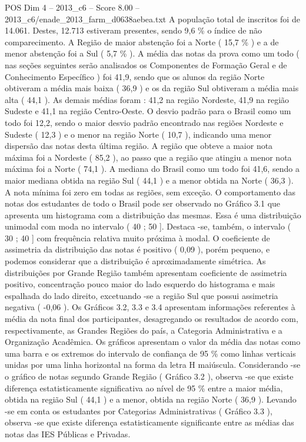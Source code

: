 \begin{textsample}{POS Dim 4 – 2013\_c6 – Score 8.00 – 2013\_c6/enade\_2013\_farm\_d0638aebea.txt}
A população total de inscritos foi de 14.061.
Destes, 12.713 estiveram presentes, sendo 9,6 \% o índice de não comparecimento.
A Região de maior abstenção foi a Norte ( 15,7 \% ) e a de menor abstenção foi a Sul ( 5,7 \% ).
A média das notas da prova como um todo ( nas seções seguintes serão analisados os Componentes de Formação Geral e de Conhecimento Específico ) foi 41,9, sendo que os alunos da região Norte obtiveram a média mais baixa ( 36,9 ) e os da região Sul obtiveram a média mais alta ( 44,1 ).
As demais médias foram : 41,2 na região Nordeste, 41,9 na região Sudeste e 41,1 na região Centro-Oeste.
O desvio padrão para o Brasil como um todo foi 12,2, sendo o maior desvio padrão encontrado nas regiões Nordeste e Sudeste ( 12,3 ) e o menor na região Norte ( 10,7 ), indicando uma menor dispersão das notas desta última região.
A região que obteve a maior nota máxima foi a Nordeste ( 85,2 ), ao passo que a região que atingiu a menor nota máxima foi a Norte ( 74,1 ).
A mediana do Brasil como um todo foi 41,6, sendo a maior mediana obtida na região Sul ( 44,1 ) e a menor obtida na Norte ( 36,3 ).
A nota mínima foi zero em todas as regiões, sem exceção.
O comportamento das notas dos estudantes de todo o Brasil pode ser observado no Gráfico 3.1 que apresenta um histograma com a distribuição das mesmas.
Essa é uma distribuição unimodal com moda no intervalo ( 40 ; 50 ].
Destaca -se, também, o intervalo ( 30 ; 40 ] com frequência relativa muito próxima à modal.
O coeficiente de assimetria da distribuição das notas é positivo ( 0,09 ), porém pequeno, e podemos considerar que a distribuição é aproximadamente simétrica.
As distribuições por Grande Região também apresentam coeficiente de assimetria positivo, concentração pouco maior do lado esquerdo do histograma e mais espalhada do lado direito, excetuando -se a região Sul que possui assimetria negativa ( -0,06 ).
Os Gráficos 3.2, 3.3 e 3.4 apresentam informações referentes à média da nota final dos participantes, desagregando os resultados de acordo com, respectivamente, as Grandes Regiões do país, a Categoria Administrativa e a Organização Acadêmica.
Os gráficos apresentam o valor da média das notas como uma barra e os extremos do intervalo de confiança de 95 \% como linhas verticais unidas por uma linha horizontal na forma da letra H maiúscula.
Considerando -se o gráfico de notas segundo Grande Região ( Gráfico 3.2 ), observa -se que existe diferença estatisticamente significativa ao nível de 95 \% entre a maior média, obtida na região Sul ( 44,1 ) e a menor, obtida na região Norte ( 36,9 ).
Levando -se em conta os estudantes por Categorias Administrativas ( Gráfico 3.3 ), observa -se que existe diferença estatisticamente significante entre as médias das notas das IES Públicas e Privadas.

\end{textsample}
